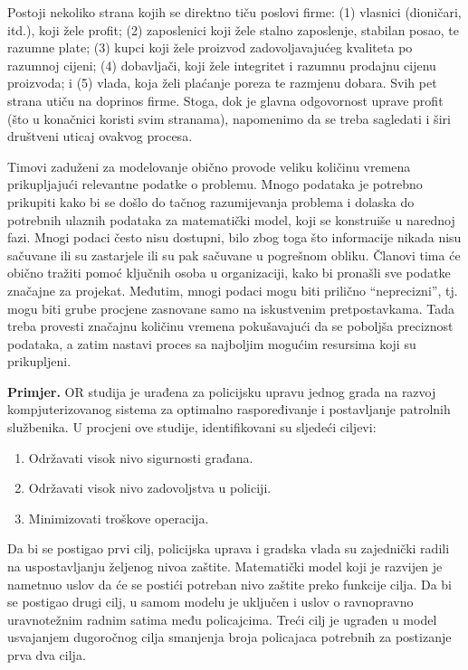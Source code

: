 \documentclass[a4paper, utf8, 11pt, colorlinks]{book}
\begin{document}
Postoji nekoliko strana kojih se direktno tiču poslovi firme: (1) vlasnici (dioničari, itd.), koji žele profit;   (2) zaposlenici koji žele stalno zaposlenje, stabilan posao, te razumne plate; (3) kupci koji žele proizvod zadovoljavajućeg kvaliteta po razumnoj cijeni;
(4) dobavljači, koji žele integritet i razumnu prodajnu cijenu proizvoda; i
(5) vlada, koja želi plaćanje poreza te razmjenu dobara. Svih pet strana utiču na doprinos firme. Stoga, dok je glavna odgovornost uprave profit (što u konačnici koristi svim stranama), napomenimo da se treba sagledati i širi društveni uticaj ovakvog procesa. 
 
 Timovi zaduženi za modelovanje obično provode veliku količinu vremena prikupljajući relevantne podatke o problemu. Mnogo podataka je potrebno prikupiti kako bi se došlo do tačnog razumijevanja problema i dolaska do potrebnih ulaznih podataka za matematički model, koji se konstruiše u narednoj fazi.  Mnogi  podaci često nisu dostupni, bilo zbog toga što informacije nikada nisu sačuvane ili su zastarjele ili su pak sačuvane u pogrešnom obliku.   Članovi tima će obično   tražiti pomoć ključnih osoba u organizaciji, kako bi pronašli sve podatke značajne za projekat. Međutim, mnogi podaci mogu biti prilično ``neprecizni'', tj. mogu biti grube procjene zasnovane samo na iskustvenim pretpostavkama. Tada treba provesti značajnu količinu vremena pokušavajući da se poboljša 
preciznost podataka, a zatim nastavi proces sa najboljim mogućim resursima koji su prikupljeni. 

\textbf{Primjer.}  OR studija je urađena za policijsku upravu jednog grada %
na razvoj kompjuterizovanog sistema za optimalno raspoređivanje i postavljanje patrolnih službenika. U procjeni   ove studije, identifikovani su sljedeći ciljevi:
\begin{enumerate}
    \item  Održavati visok nivo sigurnosti građana.
    \item  Održavati visok nivo zadovoljstva u policiji.
     \item Minimizovati troškove operacija.
\end{enumerate}
Da bi se postigao prvi cilj, policijska uprava i gradska vlada  su zajednički radili na uspostavljanju željenog nivoa zaštite.  Matematički model koji je razvijen je nametnuo uslov da će se postići potreban nivo zaštite preko funkcije cilja.  Da bi se postigao drugi cilj, u samom modelu je uključen i uslov o ravnopravno uravnotežnim radnim satima među policajcima. Treći cilj je ugrađen u model usvajanjem dugoročnog cilja smanjenja broja policajaca potrebnih za postizanje prva dva cilja. 
\end{document}
